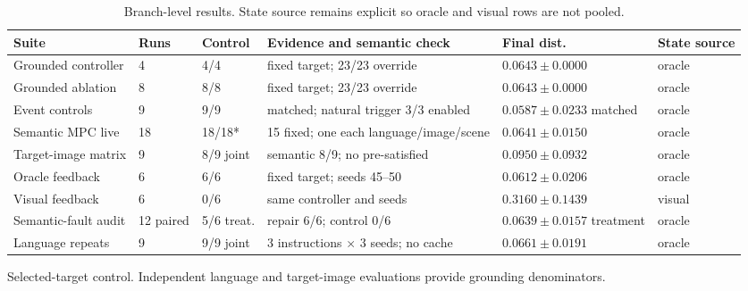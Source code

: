 \documentclass[conference]{IEEEtran}
\begin{document}
\begin{table}[!t]
\centering
\caption{Branch-level results. State source remains explicit so oracle and visual rows are not pooled.}
\label{tab:diagnostic}
\scriptsize
\renewcommand{\arraystretch}{0.90}
\setlength{\tabcolsep}{2pt}
\begin{tabular}{@{}p{}p{}p{}p{}p{}p{}@{}}
\toprule
Suite & Runs & Control & Evidence and semantic check & Final dist. & State source \\
\midrule
Grounded controller & 4 & 4/4 & fixed target; 23/23 override & $0.0643{\pm}0.0000$ & oracle \\
Grounded ablation & 8 & 8/8 & fixed target; 23/23 override & $0.0643{\pm}0.0000$ & oracle \\
Event controls & 9 & 9/9 & matched; natural trigger 3/3 enabled & $0.0587{\pm}0.0233$ matched & oracle \\
Semantic MPC live & 18 & 18/18* & 15 fixed; one each language/image/scene & $0.0641{\pm}0.0150$ & oracle \\
Target-image matrix & 9 & 8/9 joint & semantic 8/9; no pre-satisfied & $0.0950{\pm}0.0932$ & oracle \\
Oracle feedback & 6 & 6/6 & fixed target; seeds 45--50 & $0.0612{\pm}0.0206$ & oracle \\
Visual feedback & 6 & 0/6 & same controller and seeds & $0.3160{\pm}0.1439$ & visual \\
Semantic-fault audit & 12 paired & 5/6 treat. & repair 6/6; control 0/6 & $0.0639{\pm}0.0157$ treatment & oracle \\
Language repeats & 9 & 9/9 joint & 3 instructions $\times$ 3 seeds; no cache & $0.0661{\pm}0.0191$ & oracle \\
\bottomrule
\end{tabular}
\vspace{1pt}
\parbox{0.97\textwidth}{\scriptsize *Selected-target control. Independent language and target-image evaluations provide grounding denominators.}
\setlength{\tabcolsep}{6pt}
\renewcommand{\arraystretch}{1.0}
\end{table}
\end{document}
